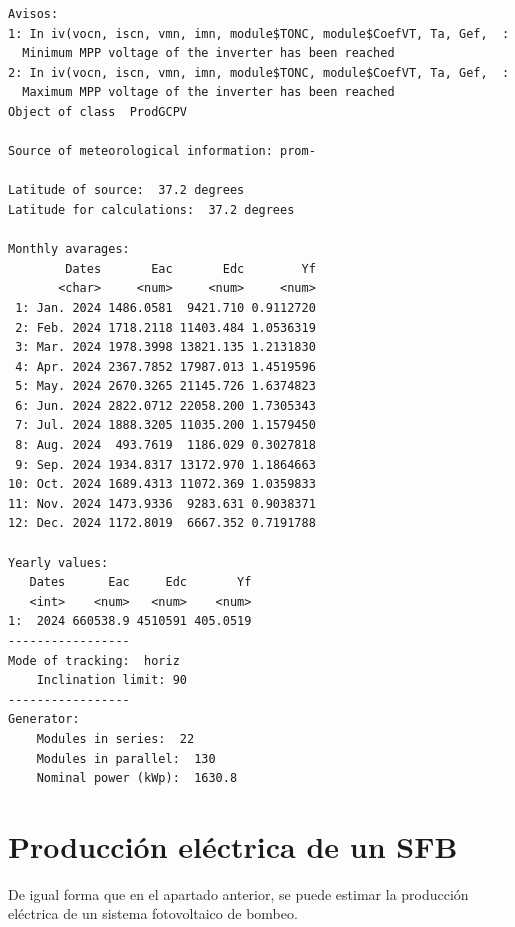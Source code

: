 \begin{verbatim}
Avisos:
1: In iv(vocn, iscn, vmn, imn, module$TONC, module$CoefVT, Ta, Gef,  :
  Minimum MPP voltage of the inverter has been reached
2: In iv(vocn, iscn, vmn, imn, module$TONC, module$CoefVT, Ta, Gef,  :
  Maximum MPP voltage of the inverter has been reached
Object of class  ProdGCPV 

Source of meteorological information: prom- 

Latitude of source:  37.2 degrees
Latitude for calculations:  37.2 degrees

Monthly avarages:
        Dates       Eac       Edc        Yf
       <char>     <num>     <num>     <num>
 1: Jan. 2024 1486.0581  9421.710 0.9112720
 2: Feb. 2024 1718.2118 11403.484 1.0536319
 3: Mar. 2024 1978.3998 13821.135 1.2131830
 4: Apr. 2024 2367.7852 17987.013 1.4519596
 5: May. 2024 2670.3265 21145.726 1.6374823
 6: Jun. 2024 2822.0712 22058.200 1.7305343
 7: Jul. 2024 1888.3205 11035.200 1.1579450
 8: Aug. 2024  493.7619  1186.029 0.3027818
 9: Sep. 2024 1934.8317 13172.970 1.1864663
10: Oct. 2024 1689.4313 11072.369 1.0359833
11: Nov. 2024 1473.9336  9283.631 0.9038371
12: Dec. 2024 1172.8019  6667.352 0.7191788

Yearly values:
   Dates      Eac     Edc       Yf
   <int>    <num>   <num>    <num>
1:  2024 660538.9 4510591 405.0519
-----------------
Mode of tracking:  horiz 
    Inclination limit: 90 
-----------------
Generator:
    Modules in series:  22 
    Modules in parallel:  130 
    Nominal power (kWp):  1630.8
\end{verbatim}

\section{Producción eléctrica de un SFB}
\label{sec:orgbaa2091}
De igual forma que en el apartado anterior, se puede estimar la producción eléctrica de un sistema fotovoltaico de bombeo.

